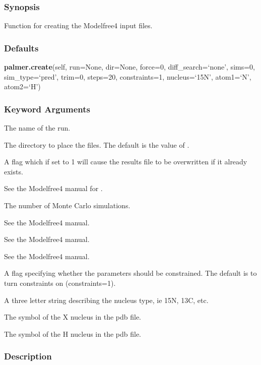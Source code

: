 \subsubsection{Synopsis}

Function for creating the Modelfree4 input files.

\subsubsection{Defaults}

\textsf{\textbf{palmer.create}(self, run=None, dir=None, force=0, diff\_search=`none', sims=0, sim\_type=`pred', trim=0, steps=20, constraints=1, nucleus=`15N', atom1=`N', atom2=`H')}


\subsubsection{Keyword Arguments}


  The name of the run.

  The directory to place the files.  The default is the value of 
.

  A flag which if set to 1 will cause the results file to be overwritten if it already exists.

  See the Modelfree4 manual for 
.

  The number of Monte Carlo simulations.

  See the Modelfree4 manual.

  See the Modelfree4 manual.

  See the Modelfree4 manual.

  A flag specifying whether the parameters should be constrained.  The default is to turn constraints on (constraints=1).

  A three letter string describing the nucleus type, ie 15N, 13C, etc.

  The symbol of the X nucleus in the pdb file.

  The symbol of the H nucleus in the pdb file.

\subsubsection{Description}


